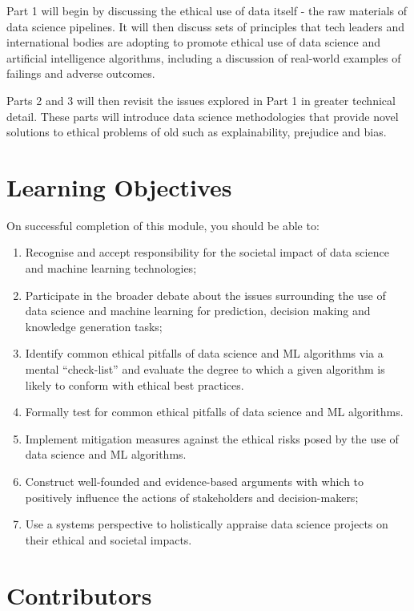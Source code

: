 \documentclass[
]{book}
\providecommand{\tightlist}{%
  \setlength{\itemsep}{0pt}\setlength{\parskip}{0pt}}
\theoremstyle{definition}
\theoremstyle{definition}
\theoremstyle{definition}
\theoremstyle{definition}
\theoremstyle{remark}
\begin{document}
Part 1 will begin by discussing the ethical use of data itself - the raw materials of data science pipelines. It will then discuss sets of principles that tech leaders and international bodies are adopting to promote ethical use of data science and artificial intelligence algorithms, including a discussion of real-world examples of failings and adverse outcomes.

Parts 2 and 3 will then revisit the issues explored in Part 1 in greater technical detail. These parts will introduce data science methodologies that provide novel solutions to ethical problems of old such as explainability, prejudice and bias.

\hypertarget{learning-objectives}{%
\section*{Learning Objectives}\label{learning-objectives}}

On successful completion of this module, you should be able to:

\begin{enumerate}
\def\labelenumi{\arabic{enumi}.}
\tightlist
\item
  Recognise and accept responsibility for the societal impact of data science and machine learning technologies;
\item
  Participate in the broader debate about the issues surrounding the use of data science and machine learning for prediction, decision making and knowledge generation tasks;
\item
  Identify common ethical pitfalls of data science and ML algorithms via a mental ``check-list'' and evaluate the degree to which a given algorithm is likely to conform with ethical best practices.
\item
  Formally test for common ethical pitfalls of data science and ML algorithms.
\item
  Implement mitigation measures against the ethical risks posed by the use of data science and ML algorithms.
\item
  Construct well-founded and evidence-based arguments with which to positively influence the actions of stakeholders and decision-makers;
\item
  Use a systems perspective to holistically appraise data science projects on their ethical and societal impacts.
\end{enumerate}

\hypertarget{contributors}{%
\section*{Contributors}\label{contributors}}
\end{document}
